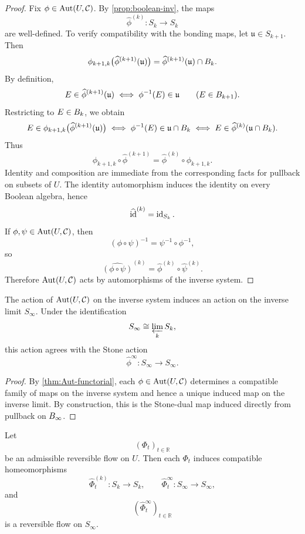 \begin{proof}
	Fix \(\phi\in\operatorname{Aut}(U,\mathcal C)\).  By
	\cref{prop:boolean-inv}, the maps
	\[
		\widehat\phi^{(k)}\colon S_k\to S_k
	\]
	are well-defined.
	To verify compatibility with the bonding maps, let
	\(\mathfrak u\in S_{k+1}\).  Then
	\[
		\phi_{k+1,k}\bigl(\widehat\phi^{(k+1)}(\mathfrak u)\bigr)
		=
		\widehat\phi^{(k+1)}(\mathfrak u)\cap B_k.
	\]
	By definition,
	\[
		E\in\widehat\phi^{(k+1)}(\mathfrak u)
		\iff
		\phi^{-1}(E)\in\mathfrak u
		\qquad
		(E\in B_{k+1}).
	\]
	Restricting to \(E\in B_k\), we obtain
	\[
		E\in\phi_{k+1,k}\bigl(\widehat\phi^{(k+1)}(\mathfrak u)\bigr)
		\iff
		\phi^{-1}(E)\in \mathfrak u\cap B_k
		\iff
		E\in\widehat\phi^{(k)}(\mathfrak u\cap B_k).
	\]
	Thus
	\[
		\phi_{k+1,k}\circ\widehat\phi^{(k+1)}
		=
		\widehat\phi^{(k)}\circ\phi_{k+1,k}.
	\]
	Identity and composition are immediate from the corresponding facts for
	pullback on subsets of \(U\).  The identity automorphism induces the
	identity on every Boolean algebra, hence
	\[
		\widehat{\operatorname{id}}^{(k)}=\operatorname{id}_{S_k}.
	\]
	If \(\phi,\psi\in\operatorname{Aut}(U,\mathcal C)\), then
	\[
		(\phi\circ\psi)^{-1}=\psi^{-1}\circ\phi^{-1},
	\]
	so
	\[
		\widehat{(\phi\circ\psi)}^{(k)}
		=
		\widehat\phi^{(k)}\circ\widehat\psi^{(k)}.
	\]
	Therefore \(\operatorname{Aut}(U,\mathcal C)\) acts by automorphisms of the inverse
	system.
\end{proof}
\begin{corollary}
	\label{cor:Aut-limit-action}
	The action of \(\operatorname{Aut}(U,\mathcal C)\) on the inverse system induces an
	action on the inverse limit \(S_\infty\).  Under the identification
	\[
		S_\infty\cong \varprojlim_k S_k,
	\]
	this action agrees with the Stone action
	\[
		\widehat\phi^\infty\colon S_\infty\to S_\infty.
	\]
\end{corollary}
\begin{proof}
	By \cref{thm:Aut-functorial}, each \(\phi\in\operatorname{Aut}(U,\mathcal C)\)
	determines a compatible family of maps on the inverse system and hence
	a unique induced map on the inverse limit.  By construction, this is
	the Stone-dual map induced directly from pullback on \(B_\infty\).
\end{proof}
\begin{corollary}
	Let
	\[
		(\Phi_t)_{t\in\mathbb R}
	\]
	be an admissible reversible flow on \(U\).  Then each \(\Phi_t\)
	induces compatible homeomorphisms
	\[
		\widehat\Phi_t^{(k)}\colon S_k\to S_k,
		\qquad
		\widehat\Phi_t^\infty\colon S_\infty\to S_\infty,
	\]
	and
	\[
		(\widehat\Phi_t^\infty)_{t\in\mathbb R}
	\]
	is a reversible flow on \(S_\infty\).
\end{corollary}
